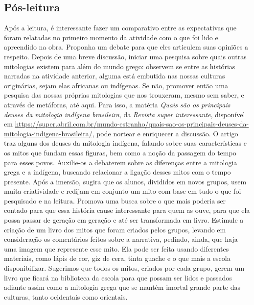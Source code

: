 \documentclass[11pt]{extarticle}
\begin{document}


\subsection{Pós-leitura}


Após a leitura, é interessante fazer um comparativo entre as expectativas que foram relatadas no primeiro momento da atividade com o que foi lido e apreendido na obra. Proponha um debate para que eles articulem suas opiniões a respeito. Depois de uma breve discussão, iniciar uma pesquisa sobre quais outras mitologias existem para além do mundo grego: observem se entre as histórias narradas na atividade anterior, alguma está embutida nas nossas culturas originárias, sejam elas africanas ou indígenas. Se não, promover então uma pesquisa das nossas próprias mitologias que nos trouxeram, mesmo sem saber, e através de metáforas, até aqui. Para isso, a matéria \textit{Quais são os principais deuses da mitologia indígena brasileira}, da \textit{Revista super interessante}, disponível em \url{https://super.abril.com.br/mundo-estranho/quais-sao-os-principais-deuses-da-mitologia-indigena-brasileira/}, pode nortear e enriquecer a discussão. O artigo traz alguns dos deuses da mitologia indígena, falando sobre suas características e os mitos que fundam essas figuras, bem como a noção da passagem do tempo para esses povos. Auxilie-os a debaterem sobre as diferenças entre a mitologia grega e a indígena, buscando relacionar a ligação desses mitos com o tempo presente. Após a imersão, sugira que os alunos, divididos em novos grupos, usem muita criatividade e redijam em conjunto um mito com base em tudo o que foi pesquisado e na leitura. Promova uma busca sobre o que mais poderia ser contado para que essa história cause interessante para quem as ouve, para que ela possa passar de geração em geração e até ser transformada em livro. Estimule a criação de um livro dos mitos que foram criados pelos grupos, levando em consideração os comentários feitos sobre a narrativa, pedindo, ainda, que haja uma imagem que represente esse mito. Ela pode ser feita usando diferentes materiais, como lápis de cor, giz de cera, tinta guache e o que mais a escola disponibilizar. Sugerimos que todos os mitos, criados por cada grupo, gerem um livro que ficará na biblioteca da escola para que possam ser lidos e passados adiante assim como a mitologia grega que se mantém imortal grande parte das culturas, tanto ocidentais como orientais.
\end{document}
